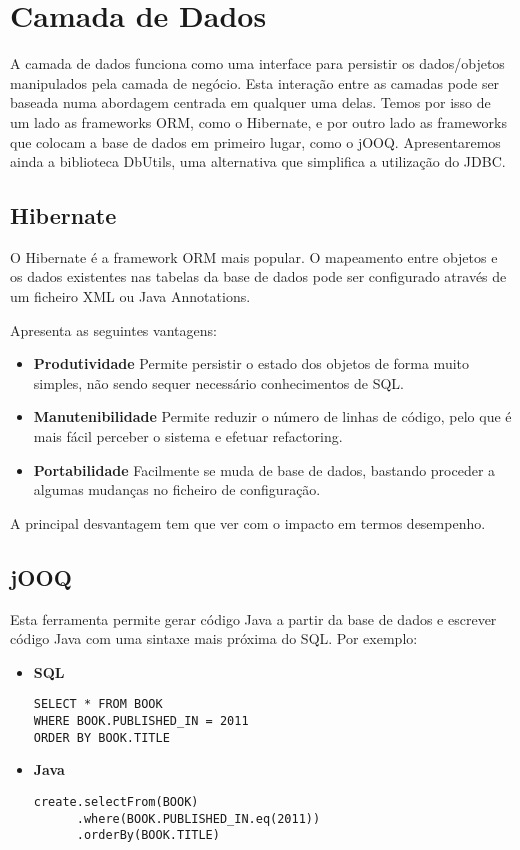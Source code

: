 \section{Camada de Dados}

A camada de dados funciona como uma interface para persistir os dados/objetos manipulados pela camada de negócio. Esta interação entre as camadas pode ser baseada numa abordagem centrada em qualquer uma delas. Temos por isso de um lado as frameworks ORM, como o Hibernate, e por outro lado as frameworks que colocam a base de dados em primeiro lugar, como o jOOQ. Apresentaremos ainda a biblioteca DbUtils, uma alternativa que simplifica a utilização do JDBC.

\subsection{Hibernate}

O Hibernate é a framework ORM mais popular. O mapeamento entre objetos e os dados existentes nas tabelas da base de dados pode ser configurado através de um ficheiro XML ou Java Annotations.

Apresenta as seguintes vantagens:
\begin{itemize}
\item \textbf{Produtividade} Permite persistir o estado dos objetos de forma muito simples, não sendo sequer necessário conhecimentos de SQL.
\item \textbf{Manutenibilidade} Permite reduzir o número de linhas de código, pelo que é mais fácil perceber o sistema e efetuar refactoring.
\item \textbf{Portabilidade} Facilmente se muda de base de dados, bastando proceder a algumas mudanças no ficheiro de configuração.
\end{itemize}

A principal desvantagem tem que ver com o impacto em termos desempenho.

\subsection{jOOQ}

Esta ferramenta permite gerar código Java a partir da base de dados e escrever código Java com uma sintaxe mais próxima do SQL. Por exemplo:\par
\begin{itemize}
\item \textbf{SQL}
\begin{verbatim}
SELECT * FROM BOOK
WHERE BOOK.PUBLISHED_IN = 2011
ORDER BY BOOK.TITLE
\end{verbatim}
\item \textbf{Java}
\begin{verbatim}
create.selectFrom(BOOK)
      .where(BOOK.PUBLISHED_IN.eq(2011))
      .orderBy(BOOK.TITLE)
\end{verbatim}
\end{itemize}

